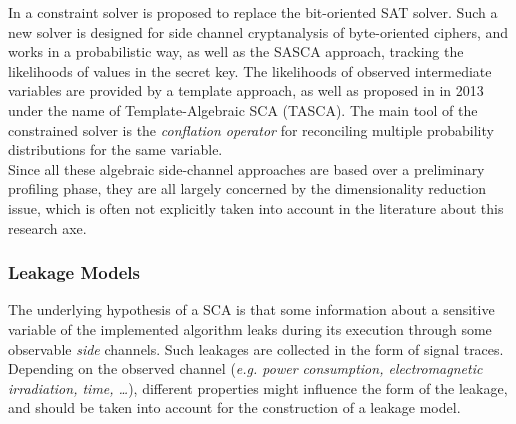 In \cite{Oren2014} a constraint solver is proposed to replace the bit-oriented SAT solver. Such a new solver is designed for side channel cryptanalysis of byte-oriented ciphers, and works in a probabilistic way, as well as the SASCA approach, tracking the likelihoods of values in the secret key. The likelihoods of observed intermediate variables are provided by a template approach, as well as proposed in \cite{Oren:2013} in 2013 under the name of Template-Algebraic SCA (TASCA). The main tool  of the constrained solver is the \emph{conflation operator} for reconciling multiple probability distributions for the same variable.\\

Since all these algebraic side-channel approaches are based over a preliminary profiling phase, they are all largely concerned by the dimensionality reduction issue, which is often not explicitly taken into account in the literature about this research axe. 

\subsubsection{Leakage Models}\label{sec:leakage_model}
The underlying hypothesis of a SCA is that some information about  a sensitive variable of the implemented algorithm leaks during its execution through some observable \emph{side} channels. Such leakages are collected 
in the form of signal traces. Depending on the observed channel (\emph{e.g. power consumption, electromagnetic irradiation, time, \dots}), different properties might influence the form of the leakage, and should be taken into account for the construction of a leakage model.\\

